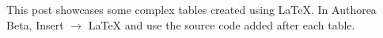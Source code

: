 This post showcases some complex tables created using LaTeX. In Authorea Beta, Insert $\rightarrow$ LaTeX and use the source code added after each table.

\newline
